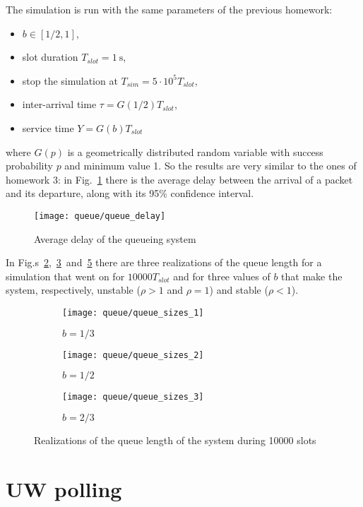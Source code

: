 \documentclass[a4paper,oneside]{article}
\begin{document}
The simulation is run with the same parameters of the previous
homework:
\begin{itemize}
\item $ b \in [1/2, 1]$,
\item slot duration $T_{slot} = \SI{1}{\s}$,
\item stop the simulation at $T_{sim} = 5 \cdot 10^5 T_{slot}$,
\item inter-arrival time $\tau = G(1/2)T_{slot}$,
\item service time $Y = G(b)T_{slot}$
\end{itemize}
where $G(p)$ is a geometrically distributed random variable with
success probability $p$ and minimum value 1. So the results are very
similar to the ones of homework 3: in Fig.~\ref{plot:queue_delay}
there is the average delay between the arrival of a packet and its
departure, along with its 95\% confidence interval.
\begin{figure}[htbp]
  \centering
    \texttt{[image: queue/queue\_delay]}
    \caption{Average delay of the queueing system}
    \label{plot:queue_delay}
\end{figure}
In
Fig.s~\ref{plot:queue_sizes_unstable},~\ref{plot:queue_sizes_limit}~and~\ref{plot:queue_sizes_stable}
there are three realizations of the queue length for a simulation that
went on for $10000T_{slot}$ and for three values of $b$ that make the
system, respectively, unstable ($\rho > 1$ and $\rho = 1$) and stable
($\rho < 1$).
\begin{figure}[htbp]
  \centering
  \begin{subfigure}{0.5\textwidth}
    \centering
    \texttt{[image: queue/queue\_sizes\_1]}
    \caption{$ b = 1/3 $}
    \label{plot:queue_sizes_unstable}
  \end{subfigure}%
  \begin{subfigure}{0.5\textwidth}
    \centering
    \texttt{[image: queue/queue\_sizes\_2]}
    \caption{$ b = 1/2 $}
    \label{plot:queue_sizes_limit}
  \end{subfigure}
  \begin{subfigure}{0.5\textwidth}
    \centering
    \texttt{[image: queue/queue\_sizes\_3]}
    \caption{$ b = 2/3 $}
    \label{plot:queue_sizes_stable}
  \end{subfigure}
  \caption{Realizations of the queue length of the system during 10000 slots}
\end{figure}

\section{UW polling}
\end{document}
